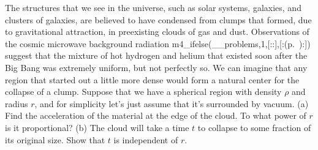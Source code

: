 The structures that we see in the universe, such as solar systems,
galaxies, and clusters of galaxies, are believed to have condensed
from clumps that formed, due to gravitational attraction, in preexisting
clouds of gas and dust. Observations of the cosmic microwave background
radiation m4_ifelse(__problems,1,[::],[:(p.~\pageref{cmb}):]) suggest that the mixture of hot
hydrogen and helium that existed soon after the Big Bang was extremely
uniform, but not perfectly so. We can imagine that any region that started
out a little more dense would form a natural center for the collapse of
a clump. Suppose that we have a spherical region with density $\rho$
and radius $r$, and for simplicity let's just assume that it's surrounded
by vacuum. (a) Find the acceleration of the material at  the edge of the
cloud. To what power of $r$ is it proportional? 
\answercheck\hwendpart
(b) The cloud will take
a time $t$ to collapse to some fraction of its original size.
Show that $t$ is independent of $r$.

